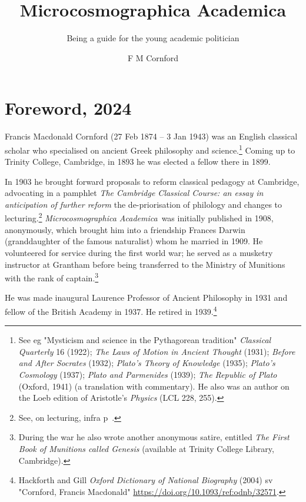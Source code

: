 \documentclass[12pt, oneside, b5paper]{memoir}
\title{Microcosmographica Academica}
\subtitle{Being a guide for the young academic politician}
\author{F M Cornford}
\date{First published 1908 \\
by Metcalfe \& Company Ltd, Cambridge
\vskip 2em
\textcopyright\ 2024 (GPL-2) by ifly6
}
\newcommand{\ma}{\textit{Microcosmographica Academica}}
\begin{document}
\begin{titlingpage}
	\maketitle
\end{titlingpage}

\frontmatter

\chapter{Foreword, 2024}

Francis Macdonald Cornford (27 Feb 1874 -- 3 Jan 1943) was an English classical scholar who specialised on ancient Greek philosophy and science.\footnote{See eg "Mysticism and science in the Pythagorean tradition" \emph{Classical Quarterly} 16 (1922); \emph{The Laws of Motion in Ancient Thought} (1931); \emph{Before and After Socrates} (1932); \emph{Plato's Theory of Knowledge} (1935); \emph{Plato's Cosmology} (1937); \emph{Plato and Parmenides} (1939); \emph{The Republic of Plato} (Oxford, 1941) (a translation with commentary). He also was an author on the Loeb edition of Aristotle's \emph{Physics} (LCL 228, 255).} Coming up to Trinity College, Cambridge, in 1893 he was elected a fellow there in 1899.

In 1903 he brought forward proposals to reform classical pedagogy at Cambridge, advocating in a pamphlet \emph{The Cambridge Classical Course: an essay in anticipation of further reform} the de-priorisation of philology and changes to lecturing.\footnote{See, on lecturing, infra p~\pageref{lecture}.} \ma\ was initially published in 1908, anonymously, which brought him into a friendship Frances Darwin (granddaughter of the famous naturalist) whom he married in 1909. He volunteered for service during the first world war; he served as a musketry instructor at Grantham before being transferred to the Ministry of Munitions with the rank of captain.\footnote{During the war he also wrote another anonymous satire, entitled \emph{The First Book of Munitions called Genesis} (available at Trinity College Library, Cambridge).}

He was made inaugural Laurence Professor of Ancient Philosophy in 1931 and fellow of the British Academy in 1937. He retired in 1939.\footnote{Hackforth and Gill \emph{Oxford Dictionary of National Biography} (2004) sv "Cornford, Francis Macdonald" \url{https://doi.org/10.1093/ref:odnb/32571}.}
\end{document}
